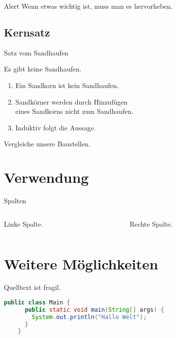 \documentclass{beamer}
\begin{document}
\begin{frame}{Alert}
  Wenn etwas \alert{wichtig} ist, muss man es \alert{hervorheben}.
\end{frame}

\subsection{Kernsatz}

\begin{frame}{Satz vom Sandhaufen}
  \begin{Satz}[Sandhaufensatz]
    Es gibt keine Sandhaufen.
  \end{Satz}

  \begin{Beweis}
    \begin{enumerate}
      \item Ein Sandkorn ist kein Sandhaufen.
      \item Sandkörner werden durch Hinzufügen\\
        eines Sandkorns nicht zum Sandhaufen.
      \item Induktiv folgt die Aussage. \qedhere
    \end{enumerate}
  \end{Beweis}

  \begin{Beispiel}
    Vergleiche unsere Baustellen.
  \end{Beispiel}
\end{frame}

\section{Verwendung}

\begin{frame}{Spalten}
  \begin{columns}
    \begin{column}{5cm}
      Linke Spalte.
    \end{column}
    \begin{column}{5cm}
      Rechte Spalte.
    \end{column}
  \end{columns}
\end{frame}

\section{Weitere Möglichkeiten}

\begin{frame}[fragile]{Quelltext ist fragil.}
  \begin{lstlisting}[gobble=4,language=Java]
    public class Main {
      public static void main(String[] args) {
        System.out.println("Hallo Welt");
      }
    }
  \end{lstlisting}
\end{frame}
\end{document}
